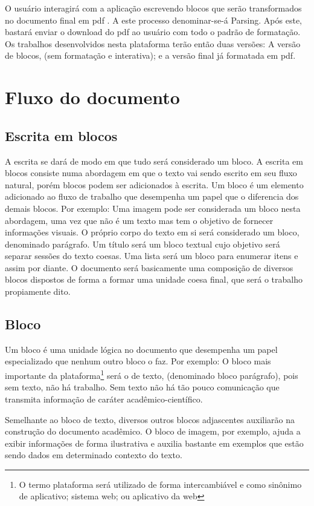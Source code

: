 O usuário interagirá com a aplicação escrevendo blocos que serão transformados
no documento final em
\acrshort{pdf}
. A este processo denominar-se-á Parsing. Após este, bastará
enviar o download do \acrshort{pdf}
ao usuário com todo o padrão de formatação. Os trabalhos desenvolvidos nesta plataforma
terão então duas versões: A versão de blocos, (sem formatação e interativa); e a versão
final já formatada em \acrshort{pdf}.

\section{Fluxo do documento}

\subsection{Escrita em blocos}

A escrita se dará de modo em que tudo será considerado um bloco.
A escrita em blocos consiste numa abordagem em que o texto vai sendo
escrito em seu fluxo natural, porém blocos podem ser adicionados à escrita.
Um bloco é um elemento adicionado ao fluxo de trabalho que desempenha um papel
que o diferencia dos demais blocos.
Por exemplo: Uma imagem pode ser considerada um bloco nesta abordagem, uma vez
que não é um texto mas tem o objetivo de fornecer informações visuais. O próprio corpo
do texto em si será considerado um bloco, denominado parágrafo. Um título será um bloco
textual cujo objetivo será separar sessões do texto coesas. Uma lista será um bloco para enumerar
itens e assim por diante. O documento será basicamente uma composição de diversos blocos dispostos de forma a formar
uma unidade coesa final, que será o trabalho propiamente dito.

\subsection{Bloco}

Um bloco é uma unidade lógica no documento que desempenha um papel especializado que nenhum
outro bloco o faz. Por exemplo: O bloco mais importante da
plataforma\footnote{O termo plataforma será utilizado
    de forma intercambiável e como sinônimo de aplicativo; sistema web; ou aplicativo da web}
será o de texto, (denominado bloco parágrafo), pois sem texto, não há trabalho.
Sem texto não há tão pouco comunicação que transmita informação
de caráter acadêmico-científico.

Semelhante ao bloco de texto, diversos outros blocos adjascentes
auxiliarão na construção do documento acadêmico. O bloco de imagem, por
exemplo, ajuda a exibir informações de forma ilustrativa e auxilia bastante
em exemplos que estão sendo dados em determinado contexto do texto.

